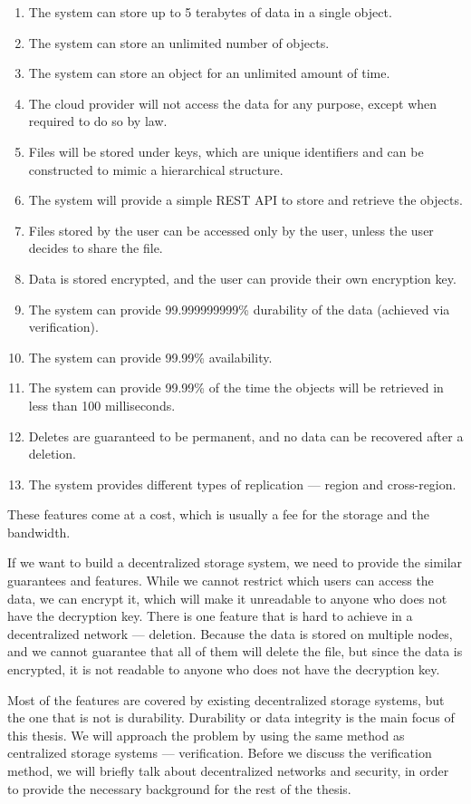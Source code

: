 \begin{enumerate}
    \label{s3-requirements}
    \item The system can store up to 5 terabytes of data in a single object.
    \item The system can store an unlimited number of objects.
    \item The system can store an object for an unlimited amount of time.
    \item The cloud provider will not access the data for any purpose, except when required to do so by law.
    \item Files will be stored under keys, which are unique identifiers and
        can be constructed to mimic a hierarchical structure.
    \item The system will provide a simple REST API to store and retrieve the objects.
    \item Files stored by the user can be accessed only by the user, unless the user decides to share the file.
    \item Data is stored encrypted, and the user can provide their own encryption key.
    \item The system can provide 99.999999999\% durability of the data (achieved via verification).
    \item The system can provide 99.99\% availability.
    \item The system can provide 99.99\% of the time the objects will be retrieved in less than 100 milliseconds.
    \item Deletes are guaranteed to be permanent, and no data can be recovered after a deletion.
    \item The system provides different types of replication --- region and cross-region.
\end{enumerate}

These features come at a cost, which is usually a fee for the storage and the bandwidth.

If we want to build a decentralized storage system, we need to provide the similar guarantees and features.
While we cannot restrict which users can access the data, we can encrypt it,
which will make it unreadable to anyone who does not have the decryption key.
There is one feature that is hard to achieve in a decentralized network --- deletion.
Because the data is stored on multiple nodes, and we cannot guarantee that all of them will delete the file,
but since the data is encrypted, it is not readable to anyone who does not have the decryption key.

Most of the features are covered by existing decentralized storage systems, but the one that is not is durability.
Durability or data integrity is the main focus of this thesis.
We will approach the problem by using the same method as centralized storage systems --- verification.
Before we discuss the verification method, we will briefly talk about decentralized networks and security,
in order to provide the necessary background for the rest of the thesis.
